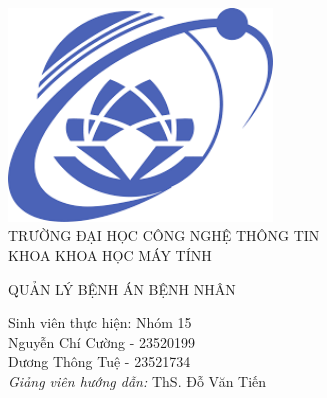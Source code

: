 \documentclass[12pt]{report}
\begin{document}
    
\begin{titlepage}      
    \begin{center}
        \includegraphics[width=7cm]{src/figures/uit.png}\\[2cm]
        {\LARGE TRƯỜNG ĐẠI HỌC CÔNG NGHỆ THÔNG TIN\\[0.5cm]
        KHOA KHOA HỌC MÁY TÍNH}\\

        \vfill

        \linespread{1.2}\huge {
            QUẢN LÝ BỆNH ÁN BỆNH NHÂN 
        }

        \vfill

        {\large
            Sinh viên thực hiện: Nhóm 15
        }\\[0.5cm]

        {\Large 
            Nguyễn Chí Cường - 23520199 \\
            Dương Thông Tuệ - 23521734
        }\\[0.5cm] 
        

        {\large 
            \emph{Giảng viên hướng dẫn:} ThS. Đỗ Văn Tiến}\\[1cm] %
        
                
    \end{center}
\end{titlepage}

\newpage
\tableofcontents


\newpage

\newpage

\end{document}
